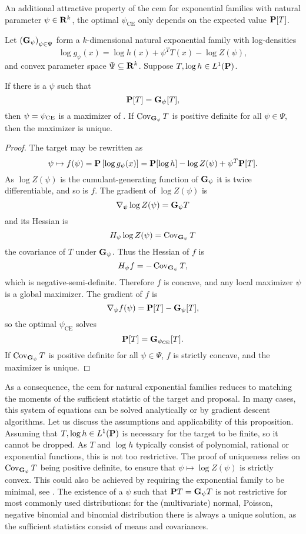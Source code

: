 An additional attractive property of the \gls{cem} for exponential families with natural parameter $\psi \in \R^{k}$, the optimal $\psi_{\text{CE}}$ only depends on the expected value $\P [T]$. 

\begin{proposition}
    \label{prop:cem_exponential_families}
    Let $\left( \G_{\psi} \right)_{\psi \in \Psi}$ form a $k$-dimensional natural exponential family with log-densities 
    $$
    \log g_{\psi}(x) = \log h(x) + \psi^{T} T(x) - \log Z(\psi),
    $$
    and convex parameter space $\Psi \subseteq \R^{k}$. 
    Suppose $T, \log h \in L^{1}(\P)$.

    If there is a $\psi$ such that 
    $$
    \P[T] = \G_{\psi} [T],
    $$
    then $\psi = \pce$ is a maximizer of . If $\cov_{\G_{\psi}} T$ is positive definite for all $\psi\in\Psi$, then the maximizer is unique.
\end{proposition}

\begin{proof}
    The target may be rewritten as
    $$
    \psi \mapsto f(\psi) = \P \left[\log g_{\psi}(x)\right]= \P [\log h] - \log Z(\psi) + \psi^{T} \P [T].
    $$
    As $\log Z(\psi)$ is the cumulant-generating function of $\G_{\psi}$ it is twice differentiable, and so is $f$. The gradient of $\log Z(\psi)$ is 
    $$
    \nabla_{\psi} \log Z(\psi) = \G_{\psi} T
    $$
    and its Hessian is 
    $$
    H_{\psi} \log Z(\psi) = \cov_{\G_{\psi}} T
    $$
    the covariance of $T$ under $\G_{\psi}$. Thus the Hessian of $f$ is 
    $$
    H_{\psi} f = - \cov_{\G_{\psi}} T,
    $$
    which is negative-semi-definite. Therefore $f$ is concave, and any local maximizer $\psi$ is a global maximizer. The gradient of $f$ is 
    $$
        \nabla_{\psi} f(\psi) = \P[T] - \G_{\psi} [T],
    $$
    so the optimal $\psi_{\text{CE}}$ solves
    $$
    \P[T] = \G_{\pce}[T].
    $$
    If $\cov_{\G_{\psi}} T$ is positive definite for all $\psi \in \Psi$, $f$ is strictly concave, and the maximizer is unique.
\end{proof}
As a consequence, the \acrshort{cem} for natural exponential families reduces to matching the moments of the sufficient statistic of the target and proposal.
In many cases, this system of equations can be solved analytically or by gradient descent algorithms.
Let us discuss the assumptions and applicability of this proposition. Assuming that $T, \log h \in L^{1}(\P)$ is necessary for the target to be finite, so it cannot be dropped. As $T$ and $\log h$ typically consist of polynomial, rational or exponential functions, this is not too restrictive. The proof of uniqueness relies on $\cov_{\G_{\psi}} T$ being positive definite, to ensure that $\psi \mapsto \log Z(\psi)$ is strictly convex. This could also be achieved by requiring the exponential family to be minimal, see \citep[Theorem 1.13 (iv)]{Brown1986Fundamentals}. The existence of a $\psi$ such that $\P T = \G_{\psi} T$ is not restrictive for most commonly used distributions: for the (multivariate) normal, Poisson, negative binomial and binomial distribution there is always a unique solution, as the sufficient statistics consist of means and covariances. 

